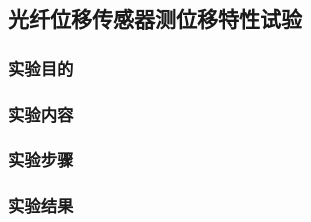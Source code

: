 \subsection{光纤位移传感器测位移特性试验}

\subsubsection{实验目的}

\subsubsection{实验内容}

\subsubsection{实验步骤}

\subsubsection{实验结果}

\newpage